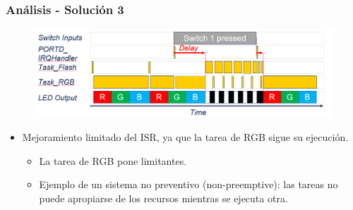 \documentclass[10.5pt,scale=1.0,t,aspectratio=169,hyperref={pdfpagelabels=false}]{beamer}
\begin{document}
\begin{frame}
	\frametitle{Análisis - Solución 3}
	\begin{figure}
		\centering
		\includegraphics[scale=0.4]{10_TimingSolution3}
	\end{figure}
	\begin{itemize}
		\item Mejoramiento limitado del ISR, ya que la tarea de RGB sigue su ejecución.
		\begin{itemize}
			\item La tarea de RGB pone limitantes.
			\item Ejemplo de un sistema no preventivo (non-preemptive): las tareas no puede apropiarse de los recursos mientras se ejecuta otra.
		\end{itemize}
	\end{itemize}
\end{frame}
\end{document}
